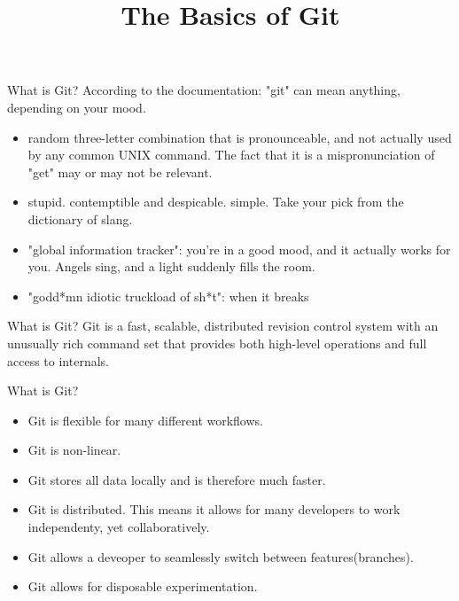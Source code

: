 \documentclass[14pt]{beamer}
\title{The Basics of Git}
\begin{document}
\begin{frame}
\titlepage
\end{frame}

\begin{frame}{What is Git?}
	According to the documentation:\newline
	"git" can mean anything, depending on your mood.
	\begin{itemize}
		\small
		\item random three-letter combination that is pronounceable, and not
		   actually used by any common UNIX command.  The fact that it is a
		   mispronunciation of "get" may or may not be relevant.
		\item stupid. contemptible and despicable. simple. Take your pick from the
		   dictionary of slang.
		\item "global information tracker": you're in a good mood, and it actually
		   works for you. Angels sing, and a light suddenly fills the room.
		\item "godd*mn idiotic truckload of sh*t": when it breaks
	\end{itemize}
\end{frame}

\begin{frame}{What is Git?}
	Git is a fast, scalable, distributed revision control system with an
	unusually rich command set that provides both high-level operations
	and full access to internals.
\end{frame}

\begin{frame}{What is Git?}
	\begin{itemize}
		\item Git is flexible for many different workflows.
		\item Git is non-linear.
		\item Git stores all data locally and is therefore much faster.
		\item Git is distributed.  This means it allows for many
			developers to work independenty, yet collaboratively.
		\item Git allows a deveoper to seamlessly switch between features(branches).
		\item Git allows for disposable experimentation.
	\end{itemize}
\end{frame}
\end{document}
